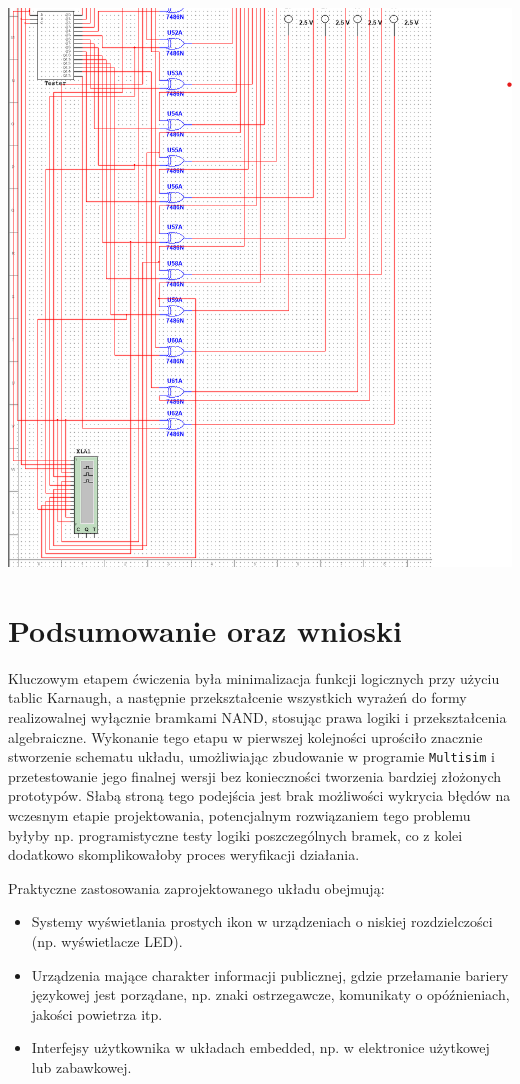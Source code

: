 \documentclass[11pt]{article}
\begin{document}
\begin{center}
\includegraphics[width=.9\linewidth]{../uklad_testujacy_cw0_dol.png}
\end{center}
\section{Podsumowanie oraz wnioski}
\label{sec:org39466c6}

Kluczowym etapem ćwiczenia była minimalizacja funkcji logicznych przy użyciu tablic Karnaugh, a następnie przekształcenie
wszystkich wyrażeń do formy realizowalnej wyłącznie bramkami NAND, stosując prawa logiki i przekształcenia algebraiczne.
Wykonanie tego etapu w pierwszej kolejności uprościło znacznie stworzenie schematu układu, umożliwiając zbudowanie w programie \texttt{Multisim}
i przetestowanie jego finalnej wersji bez konieczności tworzenia bardziej złożonych prototypów. Słabą stroną tego podejścia jest brak możliwości wykrycia
błędów na wczesnym etapie projektowania, potencjalnym rozwiązaniem tego problemu byłyby np. programistyczne testy logiki poszczególnych bramek, co z kolei
dodatkowo skomplikowałoby proces weryfikacji działania.

\bigskip

Praktyczne zastosowania zaprojektowanego układu obejmują:
\begin{itemize}
\item Systemy wyświetlania prostych ikon w urządzeniach o niskiej rozdzielczości (np. wyświetlacze LED).
\item Urządzenia mające charakter informacji publicznej, gdzie przełamanie bariery językowej jest porządane, np. znaki ostrzegawcze, komunikaty o opóźnieniach, jakości powietrza itp.
\item Interfejsy użytkownika w układach embedded, np. w elektronice użytkowej lub zabawkowej.
\end{itemize}
\end{document}
